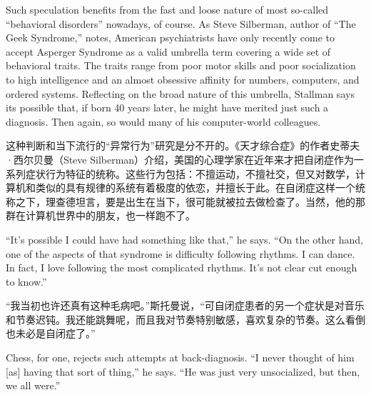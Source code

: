 \ifdefined\eng
Such speculation benefits from the fast and loose nature of most so-called ``behavioral disorders'' nowadays, of course. As Steve Silberman, author of ``The Geek Syndrome,'' notes, American psychiatrists have only recently come to accept Asperger Syndrome as a valid umbrella term covering a wide set of behavioral traits. The traits range from poor motor skills and poor socialization to high intelligence and an almost obsessive affinity for numbers, computers, and ordered systems. Reflecting on the broad nature of this umbrella, Stallman says its possible that, if born 40 years later, he might have merited just such a diagnosis. Then again, so would many of his computer-world colleagues.
\fi

\ifdefined\chs
这种判断和当下流行的``异常行为''研究是分不开的。《天才综合症》的作者史蒂夫·西尔贝曼（Steve Silberman）介绍，美国的心理学家在近年来才把自闭症作为一系列症状行为特征的统称。这些行为包括：不擅运动，不擅社交，但又对数学，计算机和类似的具有规律的系统有着极度的依恋，并擅长于此。在自闭症这样一个统称之下，理查德坦言，要是出生在当下，很可能就被拉去做检查了。当然，他的那群在计算机世界中的朋友，也一样跑不了。
\fi

\ifdefined\eng
``It's possible I could have had something like that,'' he says. ``On the other hand, one of the aspects of that syndrome is difficulty following rhythms. I can dance. In fact, I love following the most complicated rhythms. It's not clear cut enough to know.''  %
\fi

\ifdefined\chs
``我当初也许还真有这种毛病吧。''斯托曼说，``可自闭症患者的另一个症状是对音乐和节奏迟钝。我还能跳舞呢，而且我对节奏特别敏感，喜欢复杂的节奏。这么看倒也未必是自闭症了。''%
\fi

\ifdefined\eng
Chess, for one, rejects such attempts at back-diagnosis. ``I never thought of him [as] having that sort of thing,'' he says. ``He was just very unsocialized, but then, we all were.''
\fi

